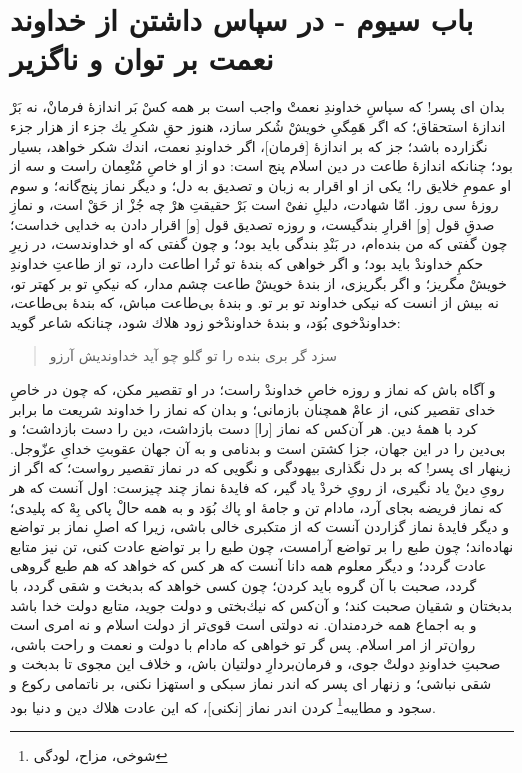 \section*{باب سیوم - در سپاس داشتن از خداوند نعمت بر توان و ناگزیر}




بدان اى پسر! كه سپاسِ خداوندِ نعمتْ واجب است بر همه كسْ بَر اندازۀ فرمانْ، نه بَرْ اندازۀ استحقاق؛ كه اگر هَمِگیِ خويشْ شُكر سازد، هنوز حقِ شكرِ يك جزء
 از هزار جزء نگزارده باشد؛ جز كه بر اندازۀ [فرمان]، اگر خداوندِ نعمت، اندك شكر خواهد، بسيار بود؛ چنانكه اندازۀ طاعت در دين اسلام پنج است: دو از او خاصِ مُنْعِمان راست و سه از او عمومِ خلايق را؛ يكى از او اقرار به زبان و تصديق به دل؛ و ديگر نماز پنج‌گانه؛ و سوم روزۀ سى روز. امّا شهادت، دليلِ نفىْ است بَرْ حقيقتِ هرْ چه جُزْ از حَقْ است، و نمازِ صدقِ قول [و] اقرارِ بندگيست، و روزه تصديق قول [و] اقرار دادن به خدايى خداست؛ چون گفتى كه من بنده‌ام، در بَنْدِ بندگى بايد بود؛ و چون گفتى كه او خداوندست، در زيرِ حكمِ خداوندْ بايد بود؛ و اگر خواهى كه بندۀ تو تُرا اطاعت دارد، تو از طاعتِ خداوندِ خويشْ مگريز؛ و اگر بگريزى، از بندۀ خويشْ طاعت چشم مدار، كه نيكیِ تو بر كهتر تو، نه بيش از انست كه نيكى خداوند تو بر تو. و بندۀ بى‌طاعت مباش، كه بندۀ بى‌طاعت، خداوندْ‌خوى بُوَد، و بندۀ خداوندْخو زود هلاك شود، چنانكه شاعر گويد:

\begin{quote}
\centering
سزد گر برى بنده را تو گلو \qquad \qquad چو آيد خداونديش آرزو
\end{quote}

و آگاه باش كه نماز و روزه خاصِ خداوندْ راست؛ در او تقصير مكن، كه چون در خاصِ خداى تقصير كنى، از عامْ همچنان بازمانى؛ و بدان كه نماز را خداوند شريعت ما برابر كرد با همۀ دين. هر آن‌كس كه نماز [را] دست بازداشت، دين را دست بازداشت؛ و بى‌دين را در اين جهان، جزا كشتن است و بدنامى و به آن جهان عقوبتِ خداىِ عزّوجل. زينهار اى پسر! كه بر دل نگذارى بيهودگى و نگويى كه در نماز تقصير رواست؛ كه اگر از روىِ دينْ ياد نگيرى، از روىِ خردْ ياد گير، كه فايدۀ نماز چند چيزست: اول آنست كه هر كه نماز فريضه بجاى آرد، مادام تن و جامۀ او پاك بُوَد و به همه حالْ پاكى بِهْ كه پليدى؛ و ديگر فايدۀ نماز گزاردن آنست كه از متكبرى خالى باشى، زيرا كه اصلِ نماز بر تواضع نهاده‌اند؛ چون طبع را بر تواضع آرامست، چون طبع را بر تواضع عادت كنى، تن نيز متابع عادت گردد؛ و ديگر معلوم همه دانا آنست كه هر كس كه خواهد كه هم طبع گروهى گردد، صحبت با آن گروه بايد كردن؛ چون كسى خواهد كه بدبخت و شقى گردد، با بدبختان و شقيان صحبت كند؛ و آن‌كس كه نيك‌بختى و دولت جويد، متابع دولت خدا باشد و به اجماع همه خردمندان. نه دولتى است قوى‌تر از دولت اسلام و نه امرى است روان‌تر از امر اسلام. پس گر تو خواهى كه مادام با دولت و نعمت و راحت باشى، صحبتِ خداوندِ دولت‌ْ جوى، و فرمان‌بردارِ دولتيان باش، و خلاف اين مجوى تا بدبخت و شقى نباشى؛ و زنهار اى پسر كه اندر نماز سبكى و استهزا نكنى، بر ناتمامى ركوع و سجود و مطايبه\footnote{شوخی، مزاح، لودگی}
 كردن اندر نماز [نکنی]، كه اين عادت هلاك دين و دنيا بود.

